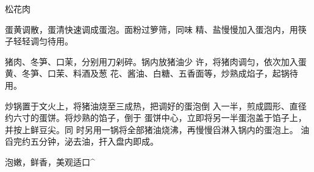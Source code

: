 \begin{recipe}{松花肉}

\ingredients


\cooking

\step 	蛋黄调散，蛋清快速调成蛋泡。面粉过箩筛，同味 精、盐慢慢加入蛋泡内，用筷子轻轻调匀待用。

\step 	猪肉、冬笋、口茉，分别用刀剁碎。锅内放猪油少 许，将猪肉调匀，依次加入蛋黄、冬笋、口茉、料酒及葱 花、酱油、白糖、五香面等，炒熟成焰子，起锅待用。

\step 炒锅置于文火上，将猪油烧至三成热，把调好的蛋泡倒 入一半，煎成圆形、直径约六寸的蛋饼。将炒熟的馅子，倒于 蛋饼中心，立即将另一半蛋泡盖于馅子上，并按上鲜豆尖。同 时另用一锅将全部猪油烧沸，再慢慢舀淋入锅内的蛋泡上。 油舀完约五分钟，泌去油，扞入盘内即成。

\notes

泡嫩，鲜香，美观适口^

\end{recipe}

